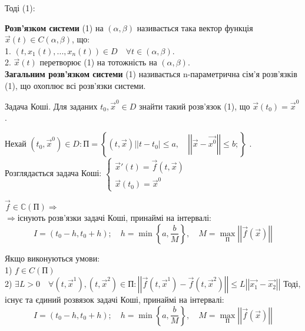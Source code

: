 \documentclass[14pt,a4paper]{scrartcl}
\theoremstyle{definition}
\theoremstyle{remark}
\theoremstyle{definition}
\theoremstyle{definition}
\begin{document}
Тоді (1): 
\ed

\def\rect{\textbf{П}}
\bd
\textbf{Розв'язком системи } (1) на $(\alpha , \beta)$ називається така вектор функція $\vec{x} (t) \in C(\alpha , \beta)$, що:\\
1. $(t, x_1 (t), ..., x_n(t))  \in D \quad \forall t \in (\alpha , \beta)$. \\
2. $ \vec{x} (t)$ перетворює (1) на тотожність на $(\alpha , \beta)$. \\
\textbf{Загальним розв'язком системи}  (1) називається n-параметрична сім'я розв'язків (1), що охоплює всі розв'язки системи.
\ed

Задача Коші. Для заданих $t_0, \vec{x}^{0} \in D$ знайти такий розв'язок (1), що $\vec{x} (t_0) = \vec{x}^{0}$.

Нехай $(t_0 , \vec{x}^0) \in D :  \textbf{П} = \left\lbrace (t, \vec{x}) \bigg |
 \left| t - t_0 \right| \leq a, \quad
 \left| \left| \vec{x} - \vec{x^{0}} \right|  \right| \leq  b;
 \right\rbrace $ .\\
 Розглядається задача Коші: $\begin{cases}
      \vec{x} ' (t)  =  \vec{f} (t, \vec{x}) \\
      \vec{x} (t_0) = \vec{x}^0
 \end{cases}$
\begin{boxteo}
$\vec{f} \in \mathbb{C} (\rect) \Longrightarrow $\\$  \Longrightarrow $існують розв'язки задачі Коші, принаймі на інтервалі: $$ I = (t_0 - h, t_0 + h); \quad h = \min{\left\lbrace a , \frac{b}{M}  \right\rbrace }, \quad M = \max_{\rect} \left| \left| \vec{f} (\vec{x}) \right|  \right| $$
\end{boxteo}
\begin{boxteo} Якщо виконуються умови:\\
    1) $f \in C (\rect)$ \\
    2) $ \exists L > 0 \quad \forall (t, \vec{x}^1 ), (t, \vec{x} ^2) \in \rect  :
    \left| \left| \vec{f} (t, \vec{x}^1) - \vec{f} (t, \vec{x}^2)  \right|   \right|  \leq  L \left|  \left| \vec{x_1} - \vec{x_2} \right|  \right| $
    Тоді, існує та єдиний розвязок задачі Коші, принаймі на інтервалі: $$ I = (t_0 - h, t_0 + h); \quad h = \min{\left\lbrace a , \frac{b}{M}  \right\rbrace }, \quad M = \max_{\rect} \left| \left| \vec{f} (\vec{x}) \right|  \right| $$
\end{boxteo}
\end{document}
